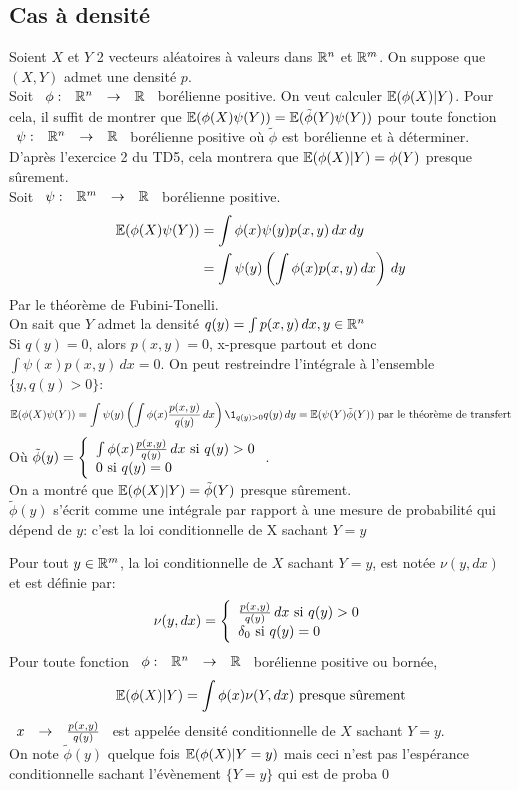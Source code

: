 \documentclass[]{report}
\begin{document}
    \subsection{Cas à densité}

    Soient $X$ et $Y$ 2 vecteurs aléatoires à valeurs dans $\mathbb{R}^n$ et $\mathbb{R}^m$. On suppose que $(X,Y)$ admet une densité $p$.\\
    Soit $\begin{array}{ccccc} \phi : & \mathbb{R}^n & \to & \mathbb{R} \end{array}$ borélienne positive. On veut calculer $\mathbb{E}(\phi(X)|Y)$. Pour cela, il suffit de montrer que $\mathbb{E}(\phi(X)\psi(Y))=\mathbb{E}(\tilde{\phi}(Y)\psi(Y))$ pour toute fonction $\begin{array}{ccccc} \psi : & \mathbb{R}^n & \to & \mathbb{R} \end{array}$ borélienne positive où $\tilde{\phi}$ est borélienne et à déterminer.\\
    D'après l'exercice 2 du TD5, cela montrera que $\mathbb{E}(\phi(X)|Y)=\phi(Y)$ presque sûrement.\\
    Soit $\begin{array}{ccccc} \psi : & \mathbb{R}^m & \to & \mathbb{R} \end{array}$ borélienne positive.
    \begin{align*}
        \mathbb{E}(\phi(X)\psi(Y))&=\int \phi(x)\psi(y)p(x,y) \, dx\, dy\\
        &=\int \psi(y)\left( \int \phi(x) p(x,y)\, dx\right)\, dy
    \end{align*}
    Par le théorème de Fubini-Tonelli.\\
    On sait que $Y$ admet la densité $q(y)=\int p(x,y)\, dx,y\in \mathbb{R}^n$\\
    Si $q(y)=0$, alors $p(x,y)=0$, x-presque partout et donc $\int \psi(x)p(x,y)\, dx= 0$. On peut restreindre l'intégrale à l'ensemble $\{y,q(y)>0\}$:
    \[\Ea(\phi(X)\psi(Y))=\int \psi(y)\left(\int \phi(x)\frac{p(x,y)}{q(y)}\, dx\right)\1_{q(y)>0}q(y)\, dy=\Ea(\psi(Y)\tilde{\phi}(Y))\text{ par le théorème de transfert}\]
    Où $\tilde{\phi}(y)=\left\{\begin{array}{ll} \int \phi(x)\frac{p(x,y)}{q(y)}\, dx \text{ si }q(y)>0\\ 0\text{ si }q(y)=0 \end{array} \right.$.\\
    On a montré que $\mathbb{E}(\phi(X)|Y)=\tilde{\phi}(Y)$ presque sûrement.\\
    $\tilde{\phi}(y)$ s'écrit comme une intégrale par rapport à une mesure de probabilité qui dépend de $y$: c'est la loi conditionnelle de X sachant $Y=y$

    \begin{dfprop}{}{}
        Pour tout $y\in \mathbb{R}^m$, la loi conditionnelle de $X$ sachant $Y=y$, est notée $\nu(y,dx)$ et est définie par:
        \[\nu(y,dx)=\left\{\begin{array}{ll} \frac{p(x,y)}{q(y)}\, dx \text{ si $q(y)>0$}\\ \delta_0 \text{ si $q(y)=0$} \end{array} \right.\]
        Pour toute fonction $\begin{array}{ccccc} \phi : & \mathbb{R}^n & \to & \mathbb{R} \end{array}$ borélienne positive ou bornée,
        \[\mathbb{E}(\phi(X)|Y)=\int \phi(x)\nu(Y,dx)\text{ presque sûrement}\]
        $\begin{array}{ccccc} x & \to & \frac{p(x,y)}{q(y)} \end{array}$ est appelée densité conditionnelle de $X$ sachant $Y=y$.\\
        On note $\tilde{\phi}(y)$ quelque fois $\mathbb{E}(\phi(X)|Y=y)$ mais ceci n'est pas l'espérance conditionnelle sachant l'évènement $\{Y=y\}$ qui est de proba $0$
    \end{dfprop}
\end{document}
